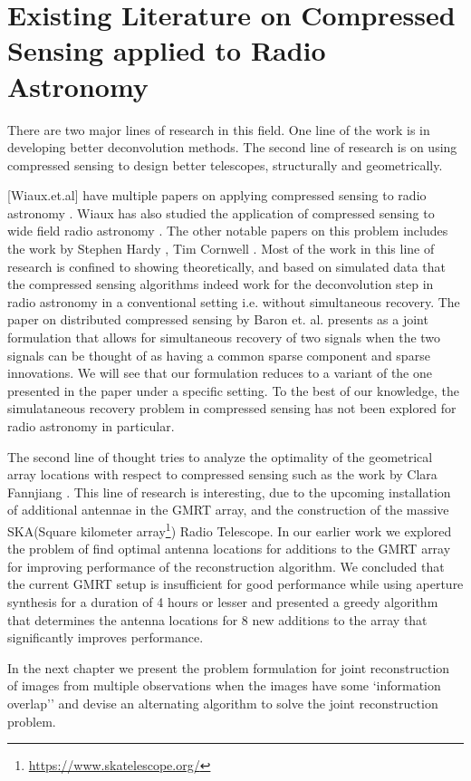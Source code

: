 \section{Existing Literature on Compressed Sensing applied to Radio Astronomy}
There are two major lines of research in this field. One line of the work is in developing better deconvolution methods. The second line of research is
on using compressed sensing to design better telescopes, structurally and geometrically. 

[Wiaux.et.al] have multiple papers on applying compressed sensing to radio astronomy \cite{Wia}. Wiaux has also studied 
the application of compressed sensing to wide field radio astronomy \cite{wide_field}. The other notable papers on this problem includes the work
 by Stephen Hardy \cite{Hardy}, Tim Cornwell \cite{cornwell}. Most of the work in this line of research is confined to showing theoretically, and based on simulated data that the compressed sensing algorithms indeed work for the deconvolution step in radio astronomy in a conventional setting i.e. without simultaneous recovery.
The paper on distributed compressed sensing by Baron et. al. \cite{JSM} presents as a joint formulation that allows for simultaneous recovery of two signals when the two signals can be thought of as having a common sparse component and sparse innovations. We will see that our formulation reduces to a variant of the one presented in the paper under a specific setting. To the best of our knowledge, the simulataneous recovery problem in compressed sensing has not been explored for radio astronomy in particular.

The second line of thought tries to analyze the optimality of the geometrical array locations with respect to compressed sensing such as the work by 
Clara Fannjiang \cite{Optimal_array}. This line of research is interesting, due to the upcoming installation of additional antennae in the GMRT array, and
the construction of the massive SKA(Square kilometer array\footnote{\url{https://www.skatelescope.org/}}) Radio Telescope. In our earlier work \cite{stage1} we explored the problem of find optimal antenna locations for additions to the GMRT array for improving performance of the reconstruction algorithm. We concluded that the current GMRT setup is insufficient for good performance while using aperture synthesis for a duration of 4 hours or lesser and presented a greedy algorithm that determines the antenna locations for 8 new additions to the array that significantly improves performance.

In the next chapter we present the problem formulation for joint reconstruction of images from multiple observations when the images have some `information overlap'' and devise an alternating algorithm to solve the joint reconstruction problem.
